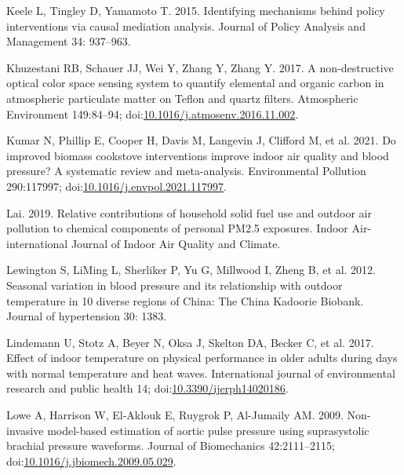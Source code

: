 \documentclass[
  letterpaper,
  DIV=11,
  numbers=noendperiod]{scrartcl}
\newlength{\cslhangindent}
\newlength{\cslentryspacingunit} %
\newenvironment{CSLReferences}[2] %
 {%
  \setlength{\parindent}{0pt}
  \ifodd #1
  \let\oldpar\par
  \def\par{\hangindent=\cslhangindent\oldpar}
  \fi
  \setlength{\parskip}{#2\cslentryspacingunit}
 }%
 {}
\begin{document}
\begin{CSLReferences}{1}{0}
\leavevmode{}%
Keele L, Tingley D, Yamamoto T. 2015. Identifying mechanisms behind
policy interventions via causal mediation analysis. Journal of Policy
Analysis and Management 34: 937--963.

\leavevmode{}%
Khuzestani RB, Schauer JJ, Wei Y, Zhang Y, Zhang Y. 2017. A
non-destructive optical color space sensing system to quantify elemental
and organic carbon in atmospheric particulate matter on {Teflon} and
quartz filters. Atmospheric Environment 149:84--94;
doi:\href{https://doi.org/10.1016/j.atmosenv.2016.11.002}{10.1016/j.atmosenv.2016.11.002}.

\leavevmode{}%
Kumar N, Phillip E, Cooper H, Davis M, Langevin J, Clifford M, et al.
2021. Do improved biomass cookstove interventions improve indoor air
quality and blood pressure? {A} systematic review and meta-analysis.
Environmental Pollution 290:117997;
doi:\href{https://doi.org/10.1016/j.envpol.2021.117997}{10.1016/j.envpol.2021.117997}.

\leavevmode{}%
Lai. 2019. Relative contributions of household solid fuel use and
outdoor air pollution to chemical components of personal {PM2}.5
exposures. Indoor Air-international Journal of Indoor Air Quality and
Climate.

\leavevmode{}%
Lewington S, LiMing L, Sherliker P, Yu G, Millwood I, Zheng B, et al.
2012. Seasonal variation in blood pressure and its relationship with
outdoor temperature in 10 diverse regions of {China}: The {China
Kadoorie Biobank}. Journal of hypertension 30: 1383.

\leavevmode{}%
Lindemann U, Stotz A, Beyer N, Oksa J, Skelton DA, Becker C, et al.
2017. Effect of indoor temperature on physical performance in older
adults during days with normal temperature and heat waves. International
journal of environmental research and public health 14;
doi:\href{https://doi.org/10.3390/ijerph14020186}{10.3390/ijerph14020186}.

\leavevmode{}%
Lowe A, Harrison W, El-Aklouk E, Ruygrok P, Al-Jumaily AM. 2009.
Non-invasive model-based estimation of aortic pulse pressure using
suprasystolic brachial pressure waveforms. Journal of Biomechanics
42:2111--2115;
doi:\href{https://doi.org/10.1016/j.jbiomech.2009.05.029}{10.1016/j.jbiomech.2009.05.029}.


\end{CSLReferences}
\end{document}
